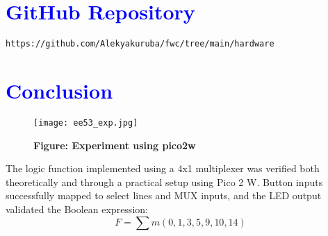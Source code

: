 \documentclass[twocolumn]{article}
\begin{document}
\section*{\textcolor{blue}{GitHub Repository}}
\texttt{https://github.com/Alekyakuruba/fwc/tree/main/hardware}
\section*{\textcolor{blue}{Conclusion}}
\begin{figure}
    \centering
    \texttt{[image: ee53\_exp.jpg]}
    \caption*{\textbf{Figure: Experiment using pico2w}}
\end{figure}
The logic function implemented using a 4x1 multiplexer was verified both theoretically and through a practical setup using Pico 2 W. Button inputs successfully mapped to select lines and MUX inputs, and the LED output validated the Boolean expression:
\[
F = \sum m(0,1,3,5,9,10,14)
\]
\end{document}
